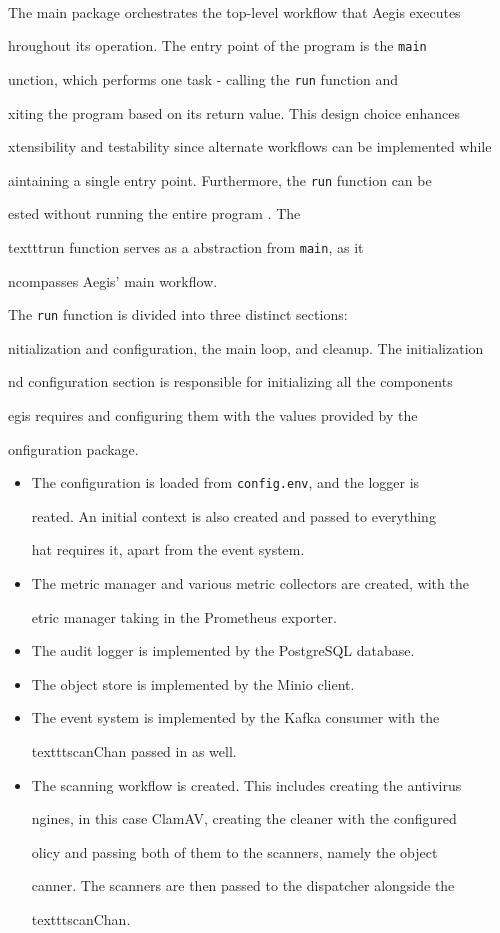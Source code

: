 \documentclass[12pt, conference, final, a4paper, onecolumn, compsoc]{IEEEtran}
\begin{document}
\paragraph{}


The main package orchestrates the top-level workflow that Aegis executes

hroughout its operation. The entry point of the program is the \texttt{main}

unction, which performs one task - calling the \texttt{run} function and

xiting the program based on its return value. This design choice enhances

xtensibility and testability since alternate workflows can be implemented while

aintaining a single entry point. Furthermore, the \texttt{run} function can be

ested without running the entire program \citep{go-tiny-abstraction}. The

texttt{run} function serves as a abstraction from \texttt{main}, as it

ncompasses Aegis' main workflow.

The \texttt{run} function is divided into three distinct sections:

nitialization and configuration, the main loop, and cleanup. The initialization

nd configuration section is responsible for initializing all the components

egis requires and configuring them with the values provided by the

onfiguration package.

\medskip
\begin{itemize}
  \item The configuration is loaded from \texttt{config.env}, and the logger is

        reated. An initial context is also created and passed to everything

        hat requires it, apart from the event system.
  \item The metric manager and various metric collectors are created, with the

        etric manager taking in the Prometheus exporter.
  \item The audit logger is implemented by the PostgreSQL database.
  \item The object store is implemented by the Minio client.
  \item The event system is implemented by the Kafka consumer with the

        texttt{scanChan} passed in as well.
  \item The scanning workflow is created. This includes creating the antivirus

        ngines, in this case ClamAV, creating the cleaner with the configured

        olicy and passing both of them to the scanners, namely the object

        canner. The scanners are then passed to the dispatcher alongside the

        texttt{scanChan}.
\end{itemize}
\bigskip
\end{document}
